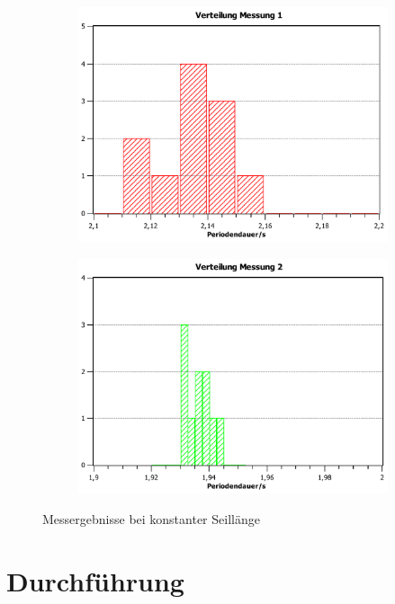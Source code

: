 \documentclass[11pt,a4paper,titlepage, ngerman]{article}
\begin{document}
		\begin{figure}[ht]
			\begin{subfigure}{0.5\textwidth}
				\centering
				\includegraphics[scale=0.35]{VerteilungMessung1.pdf}
			\end{subfigure}
			\begin{subfigure}{0.5\textwidth}
				\centering
				\includegraphics[scale=0.35]{VerteilungMessung2.pdf}
			\end{subfigure}		
			\caption{Messergebnisse bei konstanter Seillänge}
			\label{fig:seilKonst}
		\end{figure}
			
		
	
	\section{Durchführung}
		\label{Durchführung}
		
\end{document}
